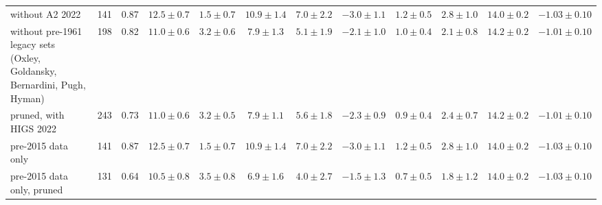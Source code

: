 \begin{tabular}{l r c cccc ccc cc}
without A2 2022 & 141 & 0.87 & $12.5\pm0.7$ & $1.5\pm0.7$ & $10.9\pm1.4$ & $7.0\pm2.2$ & $-3.0\pm1.1$ & $1.2\pm0.5$ & $2.8\pm1.0$ & $14.0\pm0.2$ & $-1.03\pm0.10$\\
without pre-1961 legacy sets (Oxley, Goldansky, Bernardini, Pugh, Hyman) & 198 & 0.82 & $11.0\pm0.6$ & $3.2\pm0.6$ & $7.9\pm1.3$ & $5.1\pm1.9$ & $-2.1\pm1.0$ & $1.0\pm0.4$ & $2.1\pm0.8$ & $14.2\pm0.2$ & $-1.01\pm0.10$\\
pruned, with HIGS 2022 & 243 & 0.73 & $11.0\pm0.6$ & $3.2\pm0.5$ & $7.9\pm1.1$ & $5.6\pm1.8$ & $-2.3\pm0.9$ & $0.9\pm0.4$ & $2.4\pm0.7$ & $14.2\pm0.2$ & $-1.01\pm0.10$\\
pre-2015 data only & 141 & 0.87 & $12.5\pm0.7$ & $1.5\pm0.7$ & $10.9\pm1.4$ & $7.0\pm2.2$ & $-3.0\pm1.1$ & $1.2\pm0.5$ & $2.8\pm1.0$ & $14.0\pm0.2$ & $-1.03\pm0.10$\\
pre-2015 data only, pruned & 131 & 0.64 & $10.5\pm0.8$ & $3.5\pm0.8$ & $6.9\pm1.6$ & $4.0\pm2.7$ & $-1.5\pm1.3$ & $0.7\pm0.5$ & $1.8\pm1.2$ & $14.0\pm0.2$ & $-1.03\pm0.10$\\
\hline
\end{tabular}

